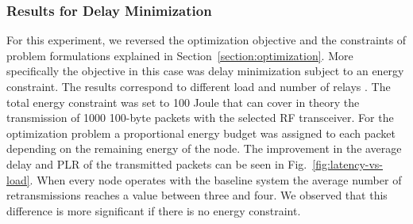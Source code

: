 \documentclass[10pt]{IEEEtran}
\newcounter{section:outage-analysis}
\begin{document}
\subsubsection{Results for Delay Minimization}
For this experiment, we reversed the optimization objective and the constraints of problem formulations explained in Section~\ref{section:optimization}. More specifically the objective in this case was delay minimization subject to an energy constraint. The results correspond to different load  and number of relays . The total energy constraint was set to 100 Joule that can cover in theory the transmission of 1000 100-byte packets with the selected RF transceiver. For the optimization problem a proportional energy budget was assigned to each packet depending on the remaining energy of the node. The improvement in the average delay and PLR of the transmitted packets can be seen in Fig.~\ref{fig:latency-vs-load}. When every node operates with the baseline system the average number of retransmissions reaches a value between three and four. We observed that this difference is more significant if there is no energy constraint.
\end{document}
